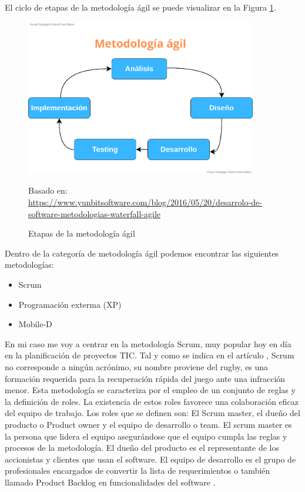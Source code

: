 El ciclo de etapas de la metodología ágil se puede visualizar en la Figura \ref{fig:etapas_agil}.

\begin{figure}[h]
\centering
\includegraphics[width=0.9\textwidth]{imagenes/03_Analisis/meto_agil.png}
\label{fig:etapas_agil}
\begin{center}
Basado en: \url{https://www.yunbitsoftware.com/blog/2016/05/20/desarrolo-de-software-metodologias-waterfall-agile}
\end{center}
\caption{Etapas de la metodología ágil}
\end{figure}

Dentro de la categoría de metodología ágil podemos encontrar las siguientes metodologías:

\begin{itemize}
\item Scrum
\item Programación exterma (XP)
\item Mobile-D
\end{itemize}

En mi caso me voy a centrar en la metodología Scrum, muy popular hoy en día en la planificación de proyectos TIC. Tal y como se indica en el artículo \cite{RefWorks:RefID:11-cevallos2018metodologias}, Scrum no corresponde a ningún acrónimo, su nombre proviene del rugby, es una formación requerida para la recuperación rápida del juego ante una infracción menor. Esta metodología se caracteriza por el empleo de un conjunto de reglas y la definición de roles. La existencia de estos roles favorece una colaboración eficaz del equipo de trabajo.
Los roles que se definen son: El Scrum master, el dueño del producto o Product owner y el equipo de desarrollo o team. El scrum master es la persona que lidera el equipo asegurándose que el equipo cumpla las reglas y procesos de la metodología. El dueño del producto es el representante de los accionistas y clientes que usan el software. El equipo de desarrollo es el grupo de profesionales encargados de convertir la lista de requerimientos o también llamado Product Backlog en funcionalidades del software \cite{RefWorks:RefID:11-cevallos2018metodologias}.

